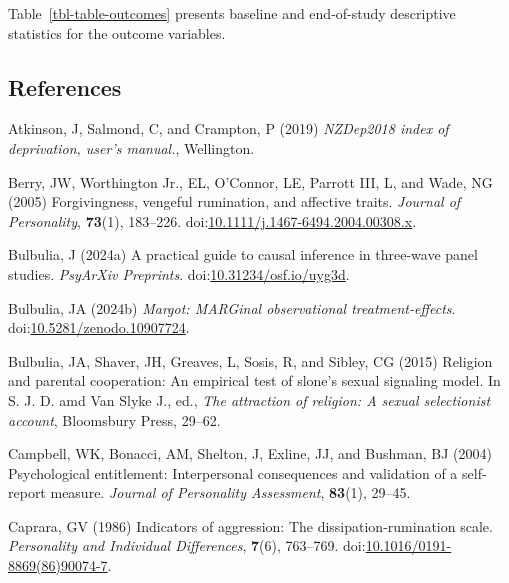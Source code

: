 \documentclass[
  single column]{article}
\newlength{\cslhangindent}
\newenvironment{CSLReferences}[2] %
 {\begin{list}{}{%
  \setlength{\itemindent}{0pt}
  \setlength{\leftmargin}{0pt}
  \setlength{\parsep}{0pt}
  \ifodd #1
   \setlength{\leftmargin}{\cslhangindent}
   \setlength{\itemindent}{-1\cslhangindent}
  \fi
  \setlength{\itemsep}{#2\baselineskip}}}
 {\end{list}}
\begin{document}
Table~\ref{tbl-table-outcomes} presents baseline and end-of-study
descriptive statistics for the outcome variables.

\newpage{}

\subsection*{References}\label{references}

\label{refs}
\begin{CSLReferences}{1}{0}
Atkinson, J, Salmond, C, and Crampton, P (2019) \emph{NZDep2018 index of
deprivation, user{'}s manual.}, Wellington.

Berry, JW, Worthington Jr., EL, O'Connor, LE, Parrott III, L, and Wade,
NG (2005) Forgivingness, vengeful rumination, and affective traits.
\emph{Journal of Personality}, \textbf{73}(1), 183--226.
doi:\href{https://doi.org/10.1111/j.1467-6494.2004.00308.x}{10.1111/j.1467-6494.2004.00308.x}.

Bulbulia, J (2024a) A practical guide to causal inference in three-wave
panel studies. \emph{PsyArXiv Preprints}.
doi:\href{https://doi.org/10.31234/osf.io/uyg3d}{10.31234/osf.io/uyg3d}.

Bulbulia, JA (2024b) \emph{Margot: MARGinal observational
treatment-effects}.
doi:\href{https://doi.org/10.5281/zenodo.10907724}{10.5281/zenodo.10907724}.

Bulbulia, JA, Shaver, JH, Greaves, L, Sosis, R, and Sibley, CG (2015)
Religion and parental cooperation: An empirical test of slone's sexual
signaling model. In S. J. D. amd Van Slyke J., ed., \emph{The attraction
of religion: A sexual selectionist account}, Bloomsbury Press, 29--62.

Campbell, WK, Bonacci, AM, Shelton, J, Exline, JJ, and Bushman, BJ
(2004) Psychological entitlement: Interpersonal consequences and
validation of a self-report measure. \emph{Journal of Personality
Assessment}, \textbf{83}(1), 29--45.

Caprara, GV (1986) Indicators of aggression: The dissipation-rumination
scale. \emph{Personality and Individual Differences}, \textbf{7}(6),
763--769.
doi:\href{https://doi.org/10.1016/0191-8869(86)90074-7}{10.1016/0191-8869(86)90074-7}.


\end{CSLReferences}
\end{document}
